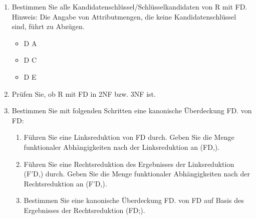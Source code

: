 \documentclass{lehramt-informatik-aufgabe}
\begin{document}
\begin{enumerate}


\item Bestimmen Sie alle Kandidatenschlüssel/Schlüsselkandidaten von R
mit FD. Hinweis: Die Angabe von Attributmengen, die keine
Kandidatenschlüssel sind, führt zu Abzügen.

\begin{liAntwort}
\begin{itemize}
\item D A
\item D C
\item D E
\end{itemize}
\end{liAntwort}


\item Prüfen Sie, ob R mit FD in 2NF bzw. 3NF ist.

\begin{liAntwort}

\end{liAntwort}


\item Bestimmen Sie mit folgenden Schritten eine kanonische Überdeckung
FD. von FD:

\begin{enumerate}


\item Führen Sie eine Linksreduktion von FD durch. Geben Sie die Menge
funktionaler Abhängigkeiten nach der Linksreduktion an (FD,).

\begin{liAntwort}

\end{liAntwort}


\item Führen Sie eine Rechtsreduktion des Ergebnisses der Linksreduktion
(F'D,) durch. Geben Sie die Menge funktionaler Abhängigkeiten nach der
Rechtsreduktion an (F’D,).

\begin{liAntwort}

\end{liAntwort}


\item Bestimmen Sie eine kanonische Überdeckung FD. von FD auf Basis des
Ergebnisses der Rechtsreduktion (FD;).


\end{enumerate}
\end{enumerate}
\end{document}
